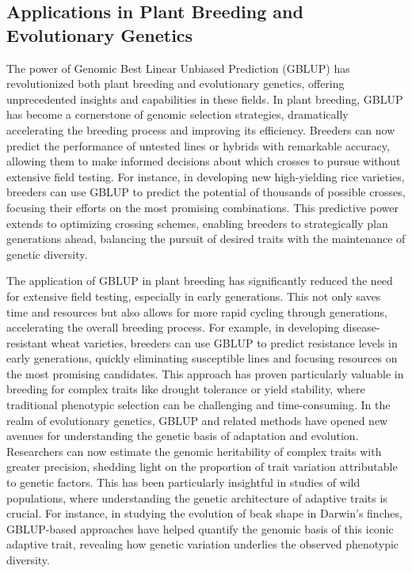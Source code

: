 \documentclass[12pt,a4paper]{article}
\begin{document}
\subsection{Applications in Plant Breeding and Evolutionary Genetics}

The power of Genomic Best Linear Unbiased Prediction (GBLUP) has revolutionized both plant breeding and evolutionary genetics, offering unprecedented insights and capabilities in these fields. In plant breeding, GBLUP has become a cornerstone of genomic selection strategies, dramatically accelerating the breeding process and improving its efficiency. Breeders can now predict the performance of untested lines or hybrids with remarkable accuracy, allowing them to make informed decisions about which crosses to pursue without extensive field testing. For instance, in developing new high-yielding rice varieties, breeders can use GBLUP to predict the potential of thousands of possible crosses, focusing their efforts on the most promising combinations. This predictive power extends to optimizing crossing schemes, enabling breeders to strategically plan generations ahead, balancing the pursuit of desired traits with the maintenance of genetic diversity.

The application of GBLUP in plant breeding has significantly reduced the need for extensive field testing, especially in early generations. This not only saves time and resources but also allows for more rapid cycling through generations, accelerating the overall breeding process. For example, in developing disease-resistant wheat varieties, breeders can use GBLUP to predict resistance levels in early generations, quickly eliminating susceptible lines and focusing resources on the most promising candidates. This approach has proven particularly valuable in breeding for complex traits like drought tolerance or yield stability, where traditional phenotypic selection can be challenging and time-consuming. In the realm of evolutionary genetics, GBLUP and related methods have opened new avenues for understanding the genetic basis of adaptation and evolution. Researchers can now estimate the genomic heritability of complex traits with greater precision, shedding light on the proportion of trait variation attributable to genetic factors. This has been particularly insightful in studies of wild populations, where understanding the genetic architecture of adaptive traits is crucial. For instance, in studying the evolution of beak shape in Darwin's finches, GBLUP-based approaches have helped quantify the genomic basis of this iconic adaptive trait, revealing how genetic variation underlies the observed phenotypic diversity.
\end{document}
